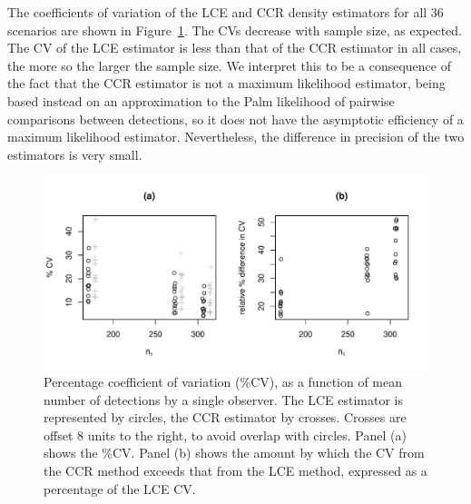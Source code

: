 \documentclass[useAMS, usenatbib, referee]{biom}\usepackage[]{graphicx}\usepackage[]{color}
\makeatletter
\def\maxwidth{ %
  \ifdim\Gin@nat@width>\linewidth
    \linewidth
  \else
    \Gin@nat@width
  \fi
}
\newenvironment{knitrout}{}{} %
\makeatother
\begin{document}
The coefficients of variation of the LCE and CCR density estimators for all 36 scenarios are shown in Figure~\ref{fig:fig_mlepalm_cv_bcs}. The CVs decrease with sample size, as expected. The CV of the LCE estimator is less than that of the CCR estimator in all cases, the more so the larger the sample size. We interpret this to be a consequence of the fact that the CCR estimator is not a maximum likelihood estimator, being based instead on an approximation to the Palm likelihood of pairwise comparisons between detections, so it does not have the asymptotic efficiency of a maximum likelihood estimator. Nevertheless, the difference in precision of the two estimators is very small.



\begin{knitrout}
\color{fgcolor}\begin{figure}

{\centering \includegraphics[width=\maxwidth]{figs/fig_mlepalm_cv_bcs-1} 

}

\caption[Percentage coefficient of variation (\%CV), as a function of mean number of detections by a single observer]{Percentage coefficient of variation (\%CV), as a function of mean number of detections by a single observer. The LCE estimator is represented by circles, the CCR estimator by crosses. Crosses are offset 8 units to the right, to avoid overlap with circles. Panel (a) shows the \%CV. Panel (b) shows the amount by which the CV from the CCR method exceeds that from the LCE method, expressed as a percentage of the LCE CV.}\label{fig:fig_mlepalm_cv_bcs}
\end{figure}


\end{knitrout}
\end{document}
